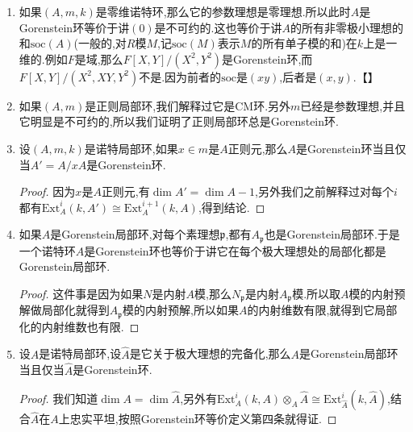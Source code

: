 \begin{enumerate}
	\item 如果$(A,m,k)$是零维诺特环,那么它的参数理想是零理想.所以此时$A$是Gorenstein环等价于讲$(0)$是不可约的.这也等价于讲$A$的所有非零极小理想的和$\mathrm{soc}(A)$(一般的,对$R$模$M$,记$\mathrm{soc}(M)$表示$M$的所有单子模的和)在$k$上是一维的.例如$F$是域,那么$F[X,Y]/(X^2,Y^2)$是Gorenstein环,而$F[X,Y]/(X^2,XY,Y^2)$不是.因为前者的$\mathrm{soc}$是$(xy)$,后者是$(x,y)$.【】
	\item 如果$(A,m)$是正则局部环,我们解释过它是CM环.另外$m$已经是参数理想,并且它明显是不可约的,所以我们证明了正则局部环总是Gorenstein环.
	\item 设$(A,m,k)$是诺特局部环,如果$x\in m$是$A$正则元,那么$A$是Gorenstein环当且仅当$A'=A/xA$是Gorenstein环.
	\begin{proof}
		
		因为$x$是$A$正则元,有$\dim A'=\dim A-1$,另外我们之前解释过对每个$i$都有$\mathrm{Ext}_A^i(k,A')\cong\mathrm{Ext}_A^{i+1}(k,A)$,得到结论.
	\end{proof}
    \item 如果$A$是Gorenstein局部环,对每个素理想$\mathfrak{p}$,都有$A_{\mathfrak{p}}$也是Gorenstein局部环.于是一个诺特环$A$是Gorenstein环也等价于讲它在每个极大理想处的局部化都是Gorenstein局部环.
    \begin{proof}
    	
    	这件事是因为如果$N$是内射$A$模,那么$N_{\mathfrak{p}}$是内射$A_{\mathfrak{p}}$模.所以取$A$模的内射预解做局部化就得到$A_{\mathfrak{p}}$模的内射预解,所以如果$A$的内射维数有限,就得到它局部化的内射维数也有限.
    \end{proof}
    \item 设$A$是诺特局部环,设$\widehat{A}$是它关于极大理想的完备化,那么$A$是Gorenstein局部环当且仅当$\widehat{A}$是Gorenstein环.
    \begin{proof}
    	
    	我们知道$\dim A=\dim\widehat{A}$,另外有$\mathrm{Ext}_A^i(k,A)\otimes_A\widehat{A}\cong\mathrm{Ext}_{\widehat{A}}^i(k,\widehat{A})$,结合$\widehat{A}$在$A$上忠实平坦,按照Gorenstein环等价定义第四条就得证.
    \end{proof}
\end{enumerate}

